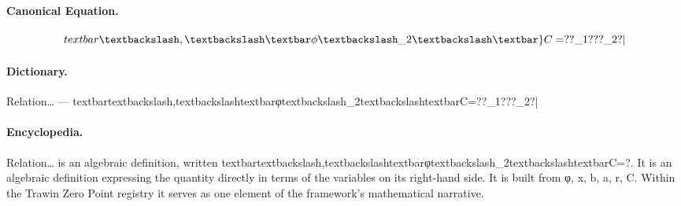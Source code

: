 \paragraph{Canonical Equation.}
\[
textbar\textbackslash,\textbackslash\textbar\phi\textbackslash\_2\textbackslash\textbar\}C=??\_1???\_2?|
\]

\paragraph{Dictionary.}
Relation… — textbartextbackslash,textbackslashtextbarφtextbackslash\_2textbackslashtextbarC=??\_1???\_2?|

\paragraph{Encyclopedia.}
Relation… is an algebraic definition, written textbartextbackslash,textbackslashtextbarφtextbackslash\_2textbackslashtextbarC=?. It is an algebraic definition expressing the quantity directly in terms of the variables on its right-hand side. It is built from φ, x, b, a, r, C. Within the Trawin Zero Point registry it serves as one element of the framework's mathematical narrative.
